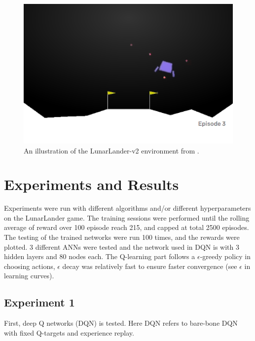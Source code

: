 \documentclass[10pt]{article}
\begin{document}
\begin{figure}[h!]
  \centering
  \includegraphics[width=0.45\linewidth]{illustration.png}
    \caption{An illustration of the LunarLander-v2 environment from .}
  \label{fig:lunarlander}
\end{figure}


\section{Experiments and Results} \label{experiments}
Experiments were run with different algorithms and/or different hyperparameters on the LunarLander game. The training sessions were performed until the rolling average of reward over 100 episode reach 215, and capped at total 2500 episodes. The testing of the trained networks were run 100 times, and the rewards were plotted. 3 different ANNs were tested and the network used in DQN is with 3 hidden layers and 80 nodes each. The Q-learning part follows a $\epsilon$-greedy policy in choosing actions, $\epsilon$ decay was relatively fast to ensure faster convergence (see $\epsilon$ in learning curves).

\par




\subsection{Experiment 1} \label{experiment1}
First, deep Q networks (DQN) is tested. Here DQN refers to bare-bone DQN with fixed Q-targets and experience replay.\cite{MnihPlayingAtariDeep2013, RoderickImplementingDeepQNetwork2017} \par
\noindent
\end{document}
